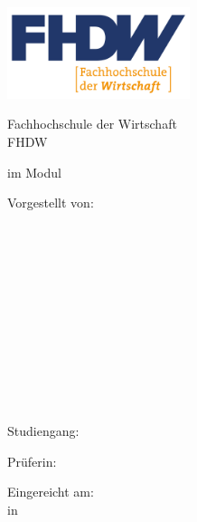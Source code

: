 \documentclass[
  11pt,
  openany, oneside]{book}
\author{}
\date{}
\begin{document}
\frontmatter

\begin{titlepage}
\centering
\thispagestyle{empty}

\vspace*{0.5cm}
\includegraphics[width=0.4\textwidth]{img/fhdw.png}

\vspace*{1cm}
{\large Fachhochschule der Wirtschaft\\[0.3em]
FHDW \fhdwstandort}

\vspace*{1.0cm}
{\large \arbeitstyp{} im Modul \modulname}

\vspace*{1.2cm}
{\Large\bfseries \thetitle}

\vspace{1.2cm}
{\normalsize Vorgestellt von:}

\vspace{0.5em}
\ifnum{}
\begin{minipage}[t]{0.6\textwidth}
\centering
\textbf{\studentname{}}\\
\studentadresse{}\\
\studentplzort{}\\
\texttt{\studentemail{}}
\end{minipage}
\else
\begin{minipage}[t]{0.45\textwidth}
\centering
\textbf{\studentname{}}\\
\studentadresse{}\\
\studentplzort{}\\
\texttt{\studentemail{}}
\end{minipage}%
\hfill
\begin{minipage}[t]{0.45\textwidth}
\centering
\textbf{\studentnameB{}}\\
\studentadresseB{}\\
\studentplzortB{}\\
\texttt{\studentemailB{}}
\end{minipage}
\fi

\vspace{1.0cm}
{\normalsize Studiengang:}\\[0.3em]
{\normalsize \studiengang{}}

\vspace{0.8cm}
{\normalsize Prüferin:}\\[0.3em]
{\normalsize \prueferA{}
\ifstrempty{\prueferB}{}{\\ \prueferB}}

\vspace{0.8cm}
{\normalsize Eingereicht am:}\\[0.3em]
{\normalsize \eingereichtam{} in \einreichungsort{}}

\end{titlepage}
\end{document}

